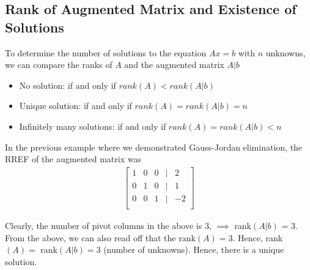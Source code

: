 \documentclass[../../linear_algebra.tex]{subfiles}
\begin{document}
\subsection{Rank of Augmented Matrix and Existence of Solutions}
To determine the number of solutions to the equation $Ax = b$ with $n$ unknowns, we can compare the ranks of $A$ and the augmented matrix $A \vert b$
\begin{itemize}
    \item No solution: if and only if $rank(A) < rank(A\lvert b)$
    \item Unique solution: if and only if $rank(A) = rank(A\vert b) = n$
    \item Infinitely many solutions: if and only if $rank(A) = rank(A\vert b) < n$
\end{itemize}

In the previous example where we demonstrated Gauss-Jordan elimination, the RREF of the augmented matrix was
\begin{align*}
    \begin{bmatrix}
    1 &0 &0 &\vert &2\\
    0 &1 &0 &\vert &1\\
    0 &0 &1 &\vert &-2\\
    \end{bmatrix}
\end{align*}

Clearly, the number of pivot columns in the above is $3$, $\implies$ rank$(A \vert b)$ = $3$. From the above, we can also read off that the rank$(A) = 3$. Hence, rank$(A) =$ rank$(A \vert b) = 3$ (number of unknowns). Hence, there is a unique solution.
\end{document}
